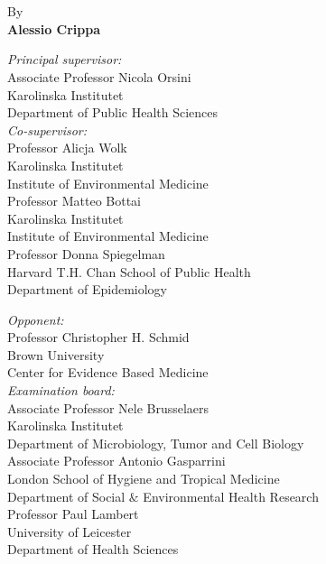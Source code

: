 \documentclass[11pt,a4paper,twoside,openany]{book}\usepackage{knitr}
\makeatletter
\def\cleardoublepage{\clearpage\if@twoside
\ifodd\c@page
\else\hbox{}\thispagestyle{empty}\newpage
\if@twocolumn\hbox{}\newpage\fi\fi\fi}
\makeatother
\begin{document}
%
\null
\vspace{1.5cm}
\\
\\
By \vspace{.5cm} \\
{\Large \textbf{\textsf{Alessio Crippa}} \vspace{2cm}}\\
\begin{minipage}[t]{6.2cm}
\singlespacing
{\small
\textit{Principal supervisor:}\\
Associate Professor Nicola Orsini \\
Karolinska Institutet \\
\bigskip
Department of Public Health Sciences \\
\textit{Co-supervisor:}\\
Professor Alicja Wolk \\
Karolinska Institutet \\
\medskip
Institute of Environmental Medicine \\
Professor Matteo Bottai \\
Karolinska Institutet \\
\medskip
Institute of Environmental Medicine \\
Professor Donna Spiegelman \\
Harvard T.H. Chan School of Public Health \\
Department of Epidemiology
}
\end{minipage}
\hspace{1.5cm}
\begin{minipage}[t]{8.1cm}
\singlespacing
{\small
\textit{Opponent:}\\
Professor Christopher H. Schmid \\
Brown University \\
Center for Evidence Based Medicine\bigskip \\
\textit{Examination board:}\\
Associate Professor Nele Brusselaers \\
Karolinska Institutet \\
Department of Microbiology, Tumor and Cell Biology \medskip \\
Associate Professor Antonio Gasparrini \\
London School of Hygiene and Tropical Medicine \\
Department of Social $\&$ Environmental Health Research\medskip \\
Professor Paul Lambert \\
University of Leicester \\
Department of Health Sciences
}
\end{minipage}
\cleardoublepage
\end{document}
